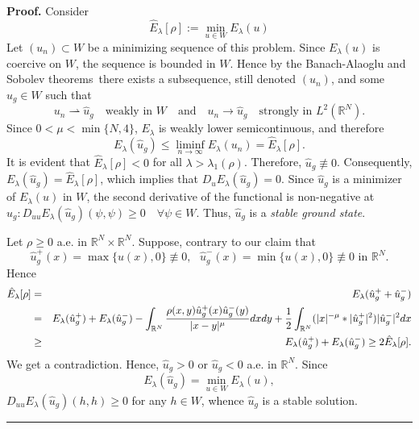 \documentclass[12pt,thmsa]{article}
\newenvironment{proof}[1][Proof]{\noindent\textbf{#1.} }{\ \rule{0.5em}{0.5em}}
\begin{document}
\begin{proof}
Consider
\begin{equation*}
\hat{E}_{\lambda }[\rho ]:=\min_{u\in W}E_{\lambda }(u)  \label{eq:gs}
\end{equation*}%
Let $(u_{n})\subset W$ be a minimizing sequence of this problem. Since $%
E_{\lambda }(u)$ is coercive on $W$, the sequence is bounded in $W$. Hence
by the Banach-Alaoglu and Sobolev theorems\ there exists a subsequence,
still denoted $(u_{n})$, and some $\hat{u}_{g}\in W$ such that
\begin{equation*}
u_{n}\rightharpoonup \hat{u}_{g}\quad \text{weakly in }W\quad \text{and}%
\quad u_{n}\rightarrow \hat{u}_{g}\quad \text{strongly in }L^{2}(\mathbb{R}%
^{N}).
\end{equation*}%
Since $0<\mu <\min \{N,4\}$, $E_{\lambda }$ is weakly lower semicontinuous,
and therefore
\begin{equation*}
E_{\lambda }(\hat{u}_{g})\leq \liminf_{n\rightarrow \infty }E_{\lambda
}(u_{n})=\hat{E}_{\lambda }[\rho ].
\end{equation*}%
It is evident that $\hat{E}_{\lambda }[\rho ]<0$ for all $\lambda >\lambda
_{1}(\rho )$. Therefore, $\hat{u}_{g}\not\equiv 0$. Consequently, $%
E_{\lambda }(\hat{u}_{g})=\hat{E}_{\lambda }[\rho ]$, which implies that $%
D_{u}E_{\lambda }(\hat{u}_{g})=0$. Since $\hat{u}_{g}$ is a minimizer of $%
E_{\lambda }(u)$ in $W$, the second derivative of the functional is
non-negative at $\hat{u}_{g}:D_{uu}E_{\lambda }(\hat{u}_{g})(\psi ,\psi
)\geq 0\quad \forall \psi \in W.$ Thus, $\hat{u}_{g}$ is a \emph{stable
ground state}.

Let $\rho \geq 0$ a.e. in $\mathbb{R}^{N}\times \mathbb{R}^{N}$. Suppose,
contrary to our claim that
\begin{equation*}
\hat{u}_{g}^{+}(x)=\max \{u(x),0\}\not\equiv 0,\text{ }\hat{u}%
_{g}^{-}(x)=\min \{u(x),0\}\not\equiv 0\text{ in }\mathbb{R}^{N}.
\end{equation*}%
Hence
\begin{eqnarray*}
\hat{E}_{\lambda }[\rho ] &=&E_{\lambda }(\hat{u}_{g}^{+}+\hat{u}_{g}^{-}) \\
&=&E_{\lambda }(\hat{u}_{g}^{+})+E_{\lambda }(\hat{u}_{g}^{-})-\int_{\mathbb{%
R}^{N}}\frac{\rho (x,y)\hat{u}_{g}^{+}(x)\hat{u}_{g}^{-}(y)}{|x-y|^{\mu }}%
dxdy+\frac{1}{2}\int_{\mathbb{R}^{N}}(|x|^{-\mu }\ast |\hat{u}_{g}^{+}|^{2})|%
\hat{u}_{g}^{-}|^{2}dx \\
&\geq &E_{\lambda }(\hat{u}_{g}^{+})+E_{\lambda }(\hat{u}_{g}^{-})\geq 2\hat{%
E}_{\lambda }[\rho ].
\end{eqnarray*}%
We get a contradiction. Hence, $\hat{u}_{g}>0$ or $\hat{u}_{g}<0$ a.e. in $%
\mathbb{R}^{N}$. Since
\begin{equation*}
E_{\lambda }(\hat{u}_{g})=\min_{u\in W}E_{\lambda }(u),
\end{equation*}%
$D_{uu}E_{\lambda }(\hat{u}_{g})(h,h)\geq 0$ for any $h\in W$, whence $\hat{u%
}_{g}$ is a stable solution.
\end{proof}
\end{document}
